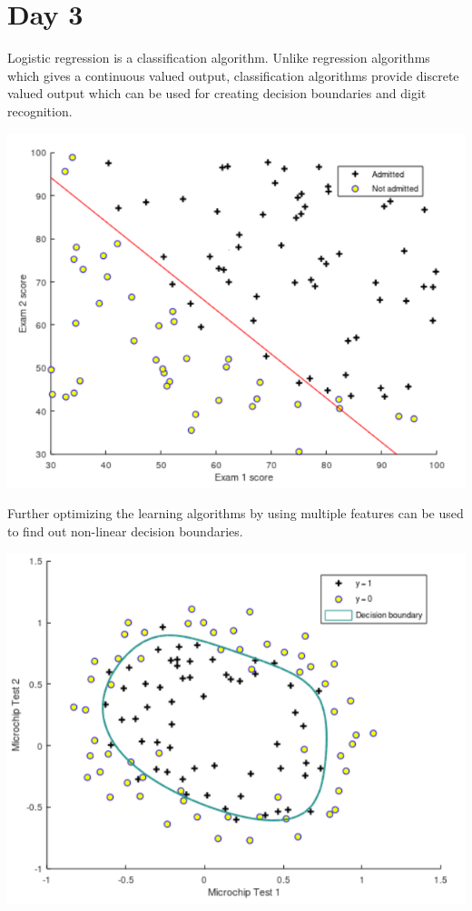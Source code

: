 \documentclass[11pt]{article}
\begin{document}
\section{Day 3}
Logistic regression is a classification algorithm. Unlike regression algorithms which gives a continuous valued output, classification algorithms provide discrete valued output which can be used for creating decision boundaries and digit recognition.\\ 
\begin{center}
\includegraphics[scale=.7]{img/simplifiedLogReg}
\end{center}
Further optimizing the learning algorithms by using multiple features can be used to find out non-linear decision boundaries.
\begin{center}
\includegraphics[scale=.7]{img/simplifiedRegLogReg.png}
\end{center}
\end{document}
